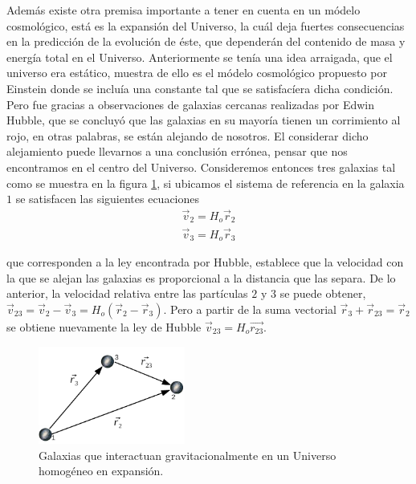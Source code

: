 Además existe otra premisa importante a tener en cuenta en un módelo 
cosmológico, está es la expansión del Universo, la cuál deja fuertes 
consecuencias en la predicción de la evolución de éste, 
que dependerán del contenido de masa y energía total en el Universo. 
Anteriormente se tenía una idea arraigada, que el universo era estático, muestra de 
ello es el módelo cosmológico propuesto por Einstein donde se incluía 
una constante tal que se satisfacíera dicha condición.
Pero fue gracias a observaciones de galaxias cercanas realizadas 
por Edwin Hubble, que se concluyó que las galaxias en su mayoría 
tienen un corrimiento al rojo, en otras palabras, se están alejando 
de nosotros. 
El considerar dicho alejamiento puede llevarnos a una conclusión errónea, 
pensar que nos encontramos en el centro del Universo. 
Conside\-remos entonces tres galaxias tal como se muestra
en la figura \ref{vectores}, si ubicamos el sistema de referencia en 
la galaxia $1$ se satisfacen las siguientes ecuaciones
\begin{eqnarray*}
\vec{v}_2=H_o \vec{r}_2\\
\vec{v}_3=H_o \vec{r}_3
\end{eqnarray*}

que corresponden a la ley encontrada por Hubble, establece que la velocidad 
con la que se alejan las galaxias es proporcional a la distancia que las separa. 
De lo anterior, la velocidad relativa entre las partículas $2$ y $3$ se puede obtener,
$\vec{v}_{23} = \vec{v}_2 -\vec{v}_3 = H_o(\vec{r}_2-\vec{r}_3)$. 	
Pero a partir de la suma vectorial $\vec{r}_3+\vec{r}_{23} = \vec{r}_2$ se obtiene nuevamente 
la ley de Hubble $\vec{v}_{23}=H_o\vec{r_{23}}$.

\begin{figure}[htbp]
       \centering
               \includegraphics[width=0.43\textwidth]{Images/chapter2/vec.pdf}
       \caption{\small Galaxias que interactuan gravitacionalmente en un Universo 
       homogéneo en expansión.}
       \label{vectores}
 \end{figure}

